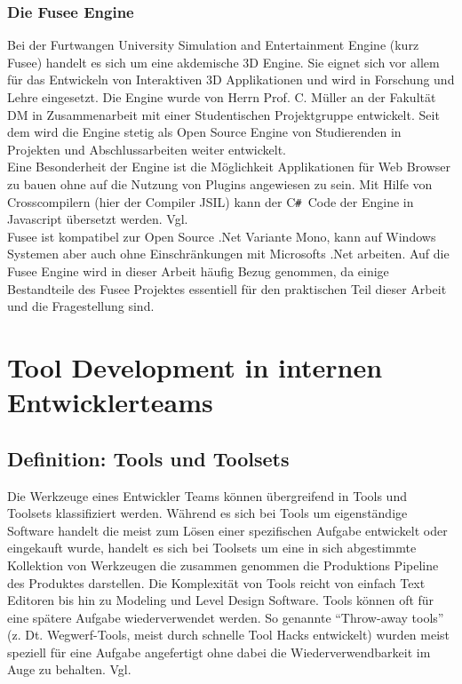 \documentclass[pagesize, paper=a4, fontsize=12pt, titlepage=true, headings=small, headnosepline, abstractoff, liststotoc, nochapterprefix, plainheadsepline, twoside]{scrreprt}
\newcommand{\CSS}{C\texttt{\# }}
\begin{document}
\subsection{Die Fusee Engine}
Bei der Furtwangen University Simulation and Entertainment Engine (kurz Fusee) handelt es sich um eine akdemische 3D Engine. Sie eignet sich vor allem für das Entwickeln von Interaktiven 3D Applikationen und wird in Forschung und Lehre eingesetzt. Die Engine wurde von Herrn Prof. C. Müller an der Fakultät DM in Zusammenarbeit mit einer Studentischen Projektgruppe entwickelt. Seit dem wird die Engine stetig als Open Source Engine von Studierenden in Projekten und Abschlussarbeiten weiter entwickelt.\\

Eine Besonderheit der Engine ist die Möglichkeit Applikationen für Web Browser zu bauen ohne auf die Nutzung von Plugins angewiesen zu sein. Mit Hilfe von Crosscompilern (hier der Compiler JSIL) kann der \CSS Code der Engine in Javascript übersetzt werden. Vgl.  \\

Fusee ist kompatibel zur Open Source .Net Variante Mono, kann auf Windows Systemen aber auch ohne Einschränkungen mit Microsofts .Net arbeiten. Auf die Fusee Engine wird in dieser Arbeit häufig Bezug genommen, da einige Bestandteile des Fusee Projektes essentiell für den praktischen Teil dieser Arbeit und die Fragestellung sind.



\chapter{Tool Development in internen Entwicklerteams}

\section{Definition: Tools und Toolsets}
Die Werkzeuge eines Entwickler Teams können übergreifend in Tools und Toolsets klassifiziert werden. Während es sich bei Tools um eigenständige Software handelt die meist zum Lösen einer spezifischen Aufgabe entwickelt oder eingekauft wurde, handelt es sich bei Toolsets um eine in sich abgestimmte Kollektion von Werkzeugen die zusammen genommen die Produktions Pipeline des Produktes darstellen. Die Komplexität von Tools reicht von einfach Text Editoren bis hin zu Modeling und Level Design Software.
Tools können oft für eine spätere Aufgabe wiederverwendet werden. So genannte “Throw-away tools” (z. Dt. Wegwerf-Tools, meist durch schnelle Tool Hacks entwickelt) wurden meist speziell für eine Aufgabe angefertigt ohne dabei die Wiederverwendbarkeit im Auge zu behalten. Vgl. \autocite[S. 3]{Wihlidal2006}
\end{document}

